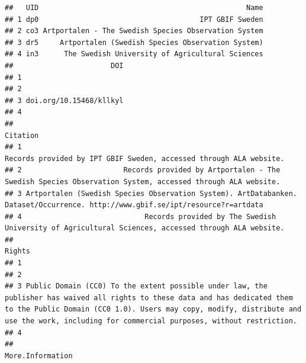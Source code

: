 \documentclass[
  10pt,
]{article}
\begin{document}
\begin{verbatim}
##   UID                                                 Name
## 1 dp0                                      IPT GBIF Sweden
## 2 co3 Artportalen - The Swedish Species Observation System
## 3 dr5     Artportalen (Swedish Species Observation System)
## 4 in3      The Swedish University of Agricultural Sciences
##                       DOI
## 1                        
## 2                        
## 3 doi.org/10.15468/kllkyl
## 4                        
##                                                                                                                         Citation
## 1                                                             Records provided by IPT GBIF Sweden, accessed through ALA website.
## 2                        Records provided by Artportalen - The Swedish Species Observation System, accessed through ALA website.
## 3 Artportalen (Swedish Species Observation System). ArtDatabanken. Dataset/Occurrence. http://www.gbif.se/ipt/resource?r=artdata
## 4                             Records provided by The Swedish University of Agricultural Sciences, accessed through ALA website.
##                                                                                                                                                                                                                                                                        Rights
## 1                                                                                                                                                                                                                                                                            
## 2                                                                                                                                                                                                                                                                            
## 3 Public Domain (CC0) To the extent possible under law, the publisher has waived all rights to these data and has dedicated them to the Public Domain (CC0 1.0). Users may copy, modify, distribute and use the work, including for commercial purposes, without restriction.
## 4                                                                                                                                                                                                                                                                            
##                                                                More.Information

\end{verbatim}
\end{document}
